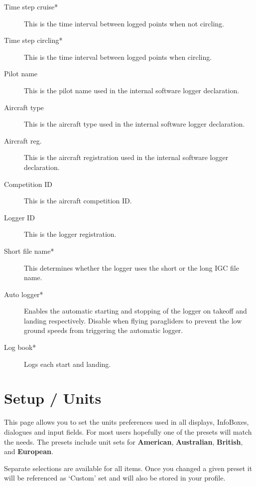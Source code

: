 \begin{description}
\item[Time step cruise*]  This is the time interval between logged points when 
  not circling. 
\item[Time step circling*]  This is the time interval between logged points when 
  circling. 
\item[Pilot name]  This is the pilot name used in the internal software logger 
  declaration.
\item[Aircraft type]  This is the aircraft type used in the internal software 
  logger declaration.
\item[Aircraft reg.]  This is the aircraft registration used in the internal 
  software logger declaration.
\item[Competition ID]  This is the aircraft competition ID.
\item[Logger ID]  This is the logger registration.
\item[Short file name*]  This determines whether the logger uses the short or the 
  long IGC file name.
\item[Auto logger*]  Enables the automatic starting and stopping of the logger
  on takeoff and landing respectively. Disable when flying paragliders to prevent 
  the low ground speeds from triggering the automatic logger.
\item[Log book*]  Logs each start and landing.
\end{description}


\section{Setup / Units}

This page allows you to set the units preferences used in all
displays, InfoBoxes, dialogues and input fields.  
For most users hopefully one of the presets will match the needs.  The presets 
include unit sets for {\bf American}, {\bf Australian}, {\bf British}, 
and {\bf European}.

Separate selections are available for all items. Once you changed a given preset it 
will be referenced as `Custom' set and will also be stored in your profile.

